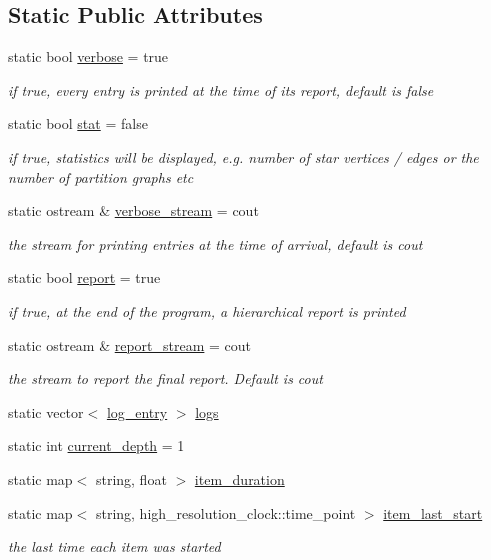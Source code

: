 \subsection*{Static Public Attributes}
\begin{DoxyCompactItemize}
\item 
static bool \hyperlink{classlogger_aab3c778c044ddf4b1b5fad8f4c230ff9}{verbose} = true
\begin{DoxyCompactList}\small\item\em if true, every entry is printed at the time of its report, default is false \end{DoxyCompactList}\item 
static bool \hyperlink{classlogger_a26812b5ba03f130e8dae3446d5fc032f}{stat} = false
\begin{DoxyCompactList}\small\item\em if true, statistics will be displayed, e.\+g. number of star vertices / edges or the number of partition graphs etc \end{DoxyCompactList}\item 
static ostream \& \hyperlink{classlogger_aec58cd6310ffb9939f8509daf1fcfbf8}{verbose\+\_\+stream} = cout
\begin{DoxyCompactList}\small\item\em the stream for printing entries at the time of arrival, default is cout \end{DoxyCompactList}\item 
static bool \hyperlink{classlogger_adbcc380b0ef53e23125f91e1c8f13f4e}{report} = true
\begin{DoxyCompactList}\small\item\em if true, at the end of the program, a hierarchical report is printed \end{DoxyCompactList}\item 
static ostream \& \hyperlink{classlogger_a8490b3400a43c9c6f3cc3cc122f10996}{report\+\_\+stream} = cout
\begin{DoxyCompactList}\small\item\em the stream to report the final report. Default is cout \end{DoxyCompactList}\item 
static vector$<$ \hyperlink{classlog__entry}{log\+\_\+entry} $>$ \hyperlink{classlogger_a46e89697a97bc41a90ec78763bfe4d39}{logs}
\item 
static int \hyperlink{classlogger_a9d29b49bd318a719a8e85b59eac54fe0}{current\+\_\+depth} = 1
\item 
static map$<$ string, float $>$ \hyperlink{classlogger_a8097637b66086185096030c96a1189ba}{item\+\_\+duration}
\item 
static map$<$ string, high\+\_\+resolution\+\_\+clock\+::time\+\_\+point $>$ \hyperlink{classlogger_af21bf7ca37e55cf225b282ab2f312c95}{item\+\_\+last\+\_\+start}
\begin{DoxyCompactList}\small\item\em the last time each item was started \end{DoxyCompactList}\end{DoxyCompactItemize}


